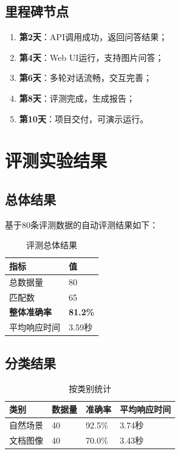 \subsection{里程碑节点}

\begin{enumerate}
  \item \textbf{第2天}：API调用成功，返回问答结果；
  \item \textbf{第4天}：Web UI运行，支持图片问答；
  \item \textbf{第6天}：多轮对话流畅，交互完善；
  \item \textbf{第8天}：评测完成，生成报告；
  \item \textbf{第10天}：项目交付，可演示运行。
\end{enumerate}

\section{评测实验结果}
\label{sec:results}

\subsection{总体结果}

基于80条评测数据的自动评测结果如下：

\begin{table}[htbp]
  \centering
  \caption{评测总体结果}
  \label{tab:eval_results}
  \begin{tabular}{|l|l|}
    \hline
    \textbf{指标} & \textbf{值} \\
    \hline
    总数据量 & 80 \\
    \hline
    匹配数 & 65 \\
    \hline
    \textbf{整体准确率} & \textbf{81.2\%} \\
    \hline
    平均响应时间 & 3.59秒 \\
    \hline
  \end{tabular}
\end{table}

\subsection{分类结果}

\begin{table}[htbp]
  \centering
  \caption{按类别统计}
  \label{tab:eval_category}
  \begin{tabular}{|l|l|l|l|}
    \hline
    \textbf{类别} & \textbf{数据量} & \textbf{准确率} & \textbf{平均响应时间} \\
    \hline
    自然场景 & 40 & 92.5\% & 3.74秒 \\
    \hline
    文档图像 & 40 & 70.0\% & 3.43秒 \\
    \hline
  \end{tabular}
\end{table}

